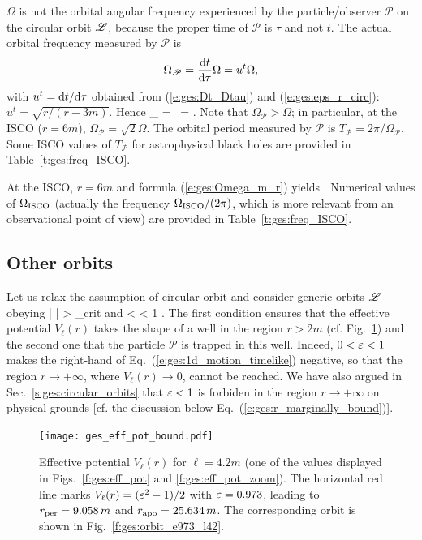 \begin{remark}
$\Omega$ is not the orbital angular frequency experienced by the particle/observer
$\mathscr{P}$ on the circular orbit $\mathscr{L}$, because the proper time of $\mathscr{P}$ is
$\tau$ and not $t$. The actual orbital frequency measured by $\mathscr{P}$
is
\[
    \Omega_{\mathscr{P}} = \frac{\mathrm{d} t}{\mathrm{d} \tau} \Omega = u^t \Omega ,
\]
with $u^t = \mathrm{d} t/\mathrm{d}\tau$ obtained from (\ref{e:ges:Dt_Dtau}) and
(\ref{e:ges:eps_r_circ}): $u^t = \sqrt{r/(r-3m)}$. Hence
\be
    \Omega_{} = \, \Omega  =
        .
\ee
Note that $\Omega_{\mathscr{P}} > \Omega$; in particular, at the ISCO ($r=6m$),
$\Omega_{\mathscr{P}} = \sqrt{2} \Omega$. The orbital period measured by $\mathscr{P}$
is $T_{\mathscr{P}} = 2\pi/\Omega_{\mathscr{P}}$. Some ISCO values of $T_{\mathscr{P}}$
for astrophysical black holes are provided in Table~\ref{t:ges:freq_ISCO}.
\end{remark}


At the ISCO, $r=6m$ and formula (\ref{e:ges:Omega_m_r}) yields
\be
     .
\ee
Numerical values of $\Omega_{\rm ISCO}$ (actually the frequency $\Omega_{\rm ISCO}/(2\pi)$,
which is more relevant from an observational point of view) are provided in
Table~\ref{t:ges:freq_ISCO}.

\subsection{Other orbits}

Let us relax the assumption of circular orbit and consider generic orbits $\mathscr{L}$
obeying
\be
    | \ell | > \ell_{\rm crit} \qquad\mbox{and} < \veps < 1 .
\ee
The first condition ensures that the effective potential $V_{\ell}(r)$
takes the shape of a well in the region $r>2m$ (cf. Fig.~\ref{f:ges:eff_pot_bound})
and the second one that the particle $\mathscr{P}$ is trapped in this well.
Indeed, $0 < \varepsilon < 1$  makes the right-hand of Eq.~(\ref{e:ges:1d_motion_timelike}) negative, so
that the region $r\rightarrow +\infty$, where $V_{\ell}(r)\rightarrow 0$,
cannot be reached. We have also argued in Sec.~\ref{s:ges:circular_orbits}
that $\varepsilon < 1$ is forbiden in the region $r\rightarrow +\infty$ on physical
grounds [cf. the discussion below Eq.~(\ref{e:ges:r_marginally_bound})].

\begin{figure}
\centerline{\texttt{[image: ges\_eff\_pot\_bound.pdf]}}
\caption[]{\label{f:ges:eff_pot_bound} \footnotesize
Effective potential $V_{\ell}(r)$ for $\ell = 4.2 m$ (one of the values displayed
in Figs.~\ref{f:ges:eff_pot}  and \ref{f:ges:eff_pot_zoom}).
The horizontal red line marks $V_{\ell}(r) = (\varepsilon^2-1)/2$
with $\varepsilon = 0.973$, leading to $r_{\rm per} = 9.058\, m$ and $r_{\rm apo} = 25.634\, m$.
The corresponding orbit is shown in Fig.~\ref{f:ges:orbit_e973_l42}.
}
\end{figure}

